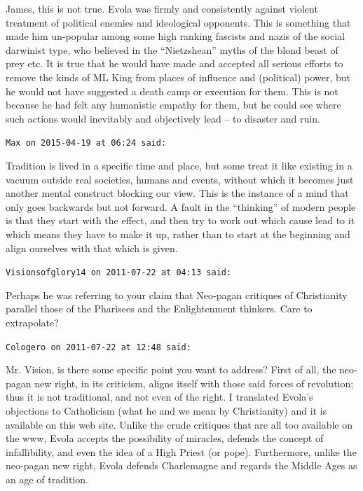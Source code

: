 \begin{footnotesize}
\begin{sffamily}
James, this is not true. Evola was firmly and consistently against violent treatment of political enemies and ideological opponents. This is something that made him un-popular among some high ranking fascists and nazis of the social darwinist type, who believed in the ``Nietzshean'' myths of the blond beast of prey etc. It is true that he would have made and accepted all serious efforts to remove the kinds of ML King from places of influence and (political) power, but he would not have suggested a death camp or execution for them. This is not because he had felt any humanistic empathy for them, but he could see where such actions would inevitably and objectively lead -- to disaster and ruin.

\hfill

\texttt{Max on 2015-04-19 at 06:24 said:}

Tradition is lived in a specific time and place, but some treat it like existing in a vacuum outside real societies, humans and events, without which it becomes just another mental construct blocking our view. This is the instance of a mind that only goes backwards but not forward. A fault in the ``thinking'' of modern people is that they start with the effect, and then try to work out which cause lead to it which means they have to make it up, rather than to start at the beginning and align ourselves with that which is given.

\hfill

\texttt{Visionsofglory14 on 2011-07-22 at 04:13 said:}

Perhaps he was referring to your claim that Neo-pagan critiques of Christianity parallel those of the Pharisees and the Enlightenment thinkers. Care to extrapolate?

\hfill

\texttt{Cologero on 2011-07-22 at 12:48 said:}

Mr. Vision, is there some specific point you want to address? First of all, the neo-pagan new right, in its criticism, aligns itself with those said forces of revolution; thus it is not traditional, and not even of the right. I translated Evola's objections to Catholicism (what he and we mean by Christianity) and it is available on this web site. Unlike the crude critiques that are all too available on the www, Evola accepts the possibility of miracles, defends the concept of infallibility, and even the idea of a High Priest (or pope). Furthermore, unlike the neo-pagan new right, Evola defends Charlemagne and regards the Middle Ages as an age of tradition.


\end{sffamily}
\end{footnotesize}
